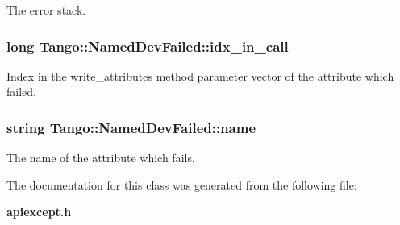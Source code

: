 The error stack. 

\subsubsection[{idx\-\_\-in\-\_\-call}]{\setlength{\rightskip}{0pt plus 5cm}long Tango\-::\-Named\-Dev\-Failed\-::idx\-\_\-in\-\_\-call}\label{classTango_1_1NamedDevFailed_a74da251e8cc904dddd1f037fb12d0288}


Index in the write\-\_\-attributes method parameter vector of the attribute which failed. 

\subsubsection[{name}]{\setlength{\rightskip}{0pt plus 5cm}string Tango\-::\-Named\-Dev\-Failed\-::name}\label{classTango_1_1NamedDevFailed_a721334d873251d8ee91fb1f0479f281b}


The name of the attribute which fails. 



The documentation for this class was generated from the following file\-:\begin{DoxyCompactItemize}
\item 
{\bf apiexcept.\-h}\end{DoxyCompactItemize}
